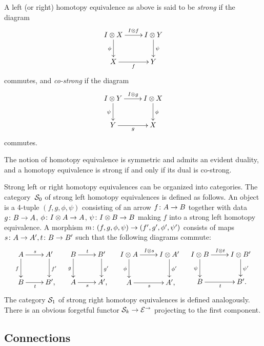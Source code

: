 \documentclass[reqno,10pt,a4paper,oneside,draft]{amsart}
\begin{document}
\begin{definition} \label{def:strhe}
A left (or right) homotopy equivalence as above is said to be \emph{strong} if the diagram
\[
\xymatrix{
  \interval \otimes X
  \ar[r]^{\interval \otimes f}
  \ar[d]_{\phi}
&
  \interval \otimes Y
  \ar[d]^{\psi}
\\
  X
  \ar[r]_{f}
&
  Y
}
\]
commutes, and \emph{co-strong} if the diagram
\[
\xymatrix{
  \interval \otimes Y
  \ar[r]^{\interval \otimes g}
  \ar[d]_{\psi}
&
  \interval \otimes X
  \ar[d]^{\phi}
\\
  Y
  \ar[r]_{g}
&
  X
}
\]
commutes.
\end{definition}

The notion of homotopy equivalence is symmetric and admits an evident duality, and a homotopy equivalence is strong if and only if its dual is co-strong.

Strong left or right homotopy equivalences can be organized into categories.
The category~$\cal{S}_0$ of strong left homotopy equivalences is defined as follows.
An object is a 4-tuple $(f, g, \phi, \psi)$ consisting of an arrow $f \co A \to B$ together with data $g \co B \to A$, $\phi \co \interval \otimes A \to A$, $\psi \co \interval \otimes B \to B$ making $f$ into a strong left homotopy equivalence.
A morphism $m \co (f, g, \phi, \psi) \to (f', g', \phi', \psi')$ consists of maps $s \co A \to A', t \co B \to B'$ such that the following diagrams commute:
\begin{align*}
\xymatrix{
  A
  \ar[r]^{s}
  \ar[d]_{f}
&
  A'
  \ar[d]^{f'}
\\
  B
  \ar[r]_{t}
&
  B'
\rlap{,}}
&&
\xymatrix{
  B
  \ar[r]^{t}
  \ar[d]_{g}
&
  B'
  \ar[d]^{g'}
\\
  A
  \ar[r]_{s}
&
  A'
\rlap{,}}
&&
\xymatrix{
  \interval \otimes A
  \ar[d]_{\phi}
  \ar[r]^{\interval \otimes s}
&
  I \otimes A'
  \ar[d]^{\phi'}
\\
  A
  \ar[r]_{s}
&
  A'
\rlap{,}}
&&
\xymatrix{
  \interval \otimes B
  \ar[d]_{\psi}
  \ar[r]^{\interval \otimes t}
&
  I \otimes B'
  \ar[d]^{\psi'}
\\
  B
  \ar[r]_{t}
&
  B'
\rlap{.}}
\end{align*}
The category $\cal{S}_1$ of strong right homotopy equivalences is defined analogously.
There is an obvious forgetful functor $\cal{S}_k \to \catE^\to$ projecting to the first component.

\subsection*{Connections}
\end{document}
